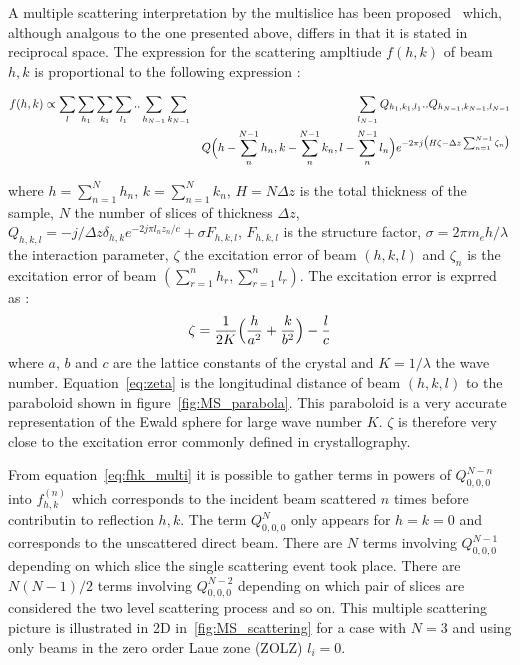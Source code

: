 A multiple scattering interpretation by the multislice has been
proposed~\cite{CowleyMoodie1957} which, although analgous to the
one presented above, differs in that it is stated in reciprocal space.
The expression for the scattering ampltiude $f(h,k)$ of beam $h,k$ is
proportional to the following expression :
%
\begin{widetext}
\begin{eqnarray}
  f(h,k) \propto
    \sum_{l}\sum_{h_1}\sum_{k_1}\sum_{l_1}..\sum_{h_{N-1}}\sum_{k_{N-1}}
  &&\sum_{l_{N-1}} Q_{h_1,k_1,l_1}..Q_{h_{N-1},k_{N-1},l_{N-1}}\nonumber\\
  &&Q\Bigl(h-\sum_{n}^{N-1}h_n,k-\sum_{n}^{N-1}k_n,l-\sum_{n}^{N-1}l_n\Bigr)
    e^{-2\pi j\bigl(H\zeta - \Delta z\sum_{n=1}^{N-1}\zeta_n\bigr)}\label{eq:fhk_multi}
\end{eqnarray}
\end{widetext}
%
where $h=\sum_{n=1}^N h_n$, $k=\sum_{n=1}^N k_n$,
$H=N\Delta z$ is the total thickness of the sample,
$N$ the number of slices of thickness $\Delta z$,
$Q_{h,k,l}=-j/\Delta z\delta_{h,k}e^{-2j\pi l_n z_n/c} + \sigma F_{h,k,l}$,
$F_{h,k,l}$ is the structure factor,
$\sigma=2\pi m_eh/\lambda$ the interaction parameter,
$\zeta$ the excitation error of beam $(h,k,l)$ and
$\zeta_n$ is the excitation error of beam
$\left(\sum_{r=1}^{n} h_r,\sum_{r=1}^n l_r\right)$.
The excitation error is exprred as :
%
\begin{equation}\label{eq:zeta}
  \zeta = \frac{1}{2K}\Bigl(\frac{h}{a^2} + \frac{k}{b^2}\Bigr) - \frac{l}{c}
\end{equation}
%
where $a$, $b$ and $c$ are the lattice constants of the crystal and
$K=1/\lambda$ the wave number.
Equation~\eqref{eq:zeta} is the longitudinal distance of beam $(h,k,l)$ to
the paraboloid shown in figure~\ref{fig:MS_parabola}.
This paraboloid is a very accurate representation of the Ewald sphere for
large wave number $K$. $\zeta$ is therefore very close to the excitation
error commonly defined in crystallography.

From equation~\eqref{eq:fhk_multi} it is possible to gather terms in
powers of $Q_{0,0,0}^{N-n}$ into $f_{h,k}^{(n)}$ which corresponds to the
incident beam scattered $n$ times before contributin to reflection $h,k$.
The term $Q_{0,0,0}^N$ only appears for $h=k=0$ and corresponds to the
unscattered direct beam.
There are $N$ terms involving $Q_{0,0,0}^{N-1}$ depending on which slice
the single scattering event took place.
There are $N(N-1)/2$ terms involving $Q_{0,0,0}^{N-2}$ depending on which
pair of slices are considered the two level scattering process and so on.
This multiple scattering picture is illustrated in 2D in~\ref{fig:MS_scattering}
for a case with $N=3$ and using only beams in the zero order Laue zone (ZOLZ)
$l_i=0$.

